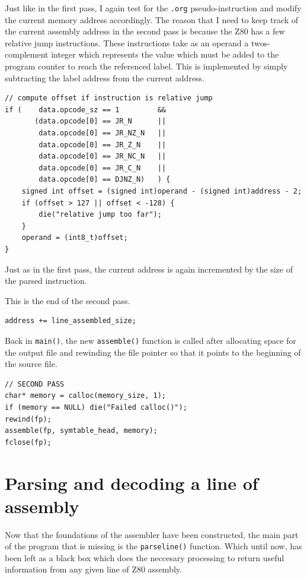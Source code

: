 \documentclass[a4paper]{report}
\begin{document}
Just like in the first pass, I again test for the \texttt{.org}
pseudo-instruction and modify the current memory address accordingly. The reason
that I need to keep track of the current assembly address in the second pass is
because the Z80 has a few relative jump instructions. These instructions take as
an operand a twos-complement integer which represents the value which must be
added to the program counter to reach the referenced label. This is implemented
by simply subtracting the label address from the current address.

\begin{lstlisting}
// compute offset if instruction is relative jump
if (	data.opcode_sz == 1			&&
	   (data.opcode[0] == JR_N		||
		data.opcode[0] == JR_NZ_N	||
		data.opcode[0] == JR_Z_N	||
		data.opcode[0] == JR_NC_N	||
		data.opcode[0] == JR_C_N	||
		data.opcode[0] == DJNZ_N)	) {
	signed int offset = (signed int)operand - (signed int)address - 2;
	if (offset > 127 || offset < -128) {
		die("relative jump too far");
	}
	operand = (int8_t)offset;
}
\end{lstlisting}

Just as in the first pass, the current address is again incremented by the size
of the parsed instruction.

This is the end of the second pass.

\begin{lstlisting}
address += line_assembled_size;
\end{lstlisting}

Back in \texttt{main()}, the new \texttt{assemble()} function is called after
allocating space for the output file and rewinding the file pointer so that it
points to the beginning of the source file.

\begin{lstlisting}
// SECOND PASS
char* memory = calloc(memory_size, 1);
if (memory == NULL) die("Failed calloc()");
rewind(fp);
assemble(fp, symtable_head, memory);
fclose(fp);
\end{lstlisting}

\section{Parsing and decoding a line of assembly}

Now that the foundations of the assembler have been constructed, the main part
of the program that is missing is the \texttt{parseline()} function. Which until
now, has been left as a black box which does the neccesary processing to return
useful information from any given line of Z80 assembly.
\end{document}
